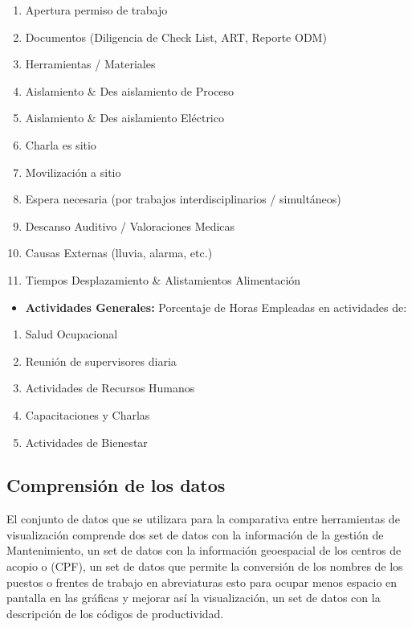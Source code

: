 \documentclass[
  11pt,
  bookmarksnumbered]{article}
\providecommand{\tightlist}{%
  \setlength{\itemsep}{0pt}\setlength{\parskip}{0pt}}
\begin{document}
\begin{enumerate}
\def\labelenumi{\arabic{enumi}.}
\tightlist
\item
  Apertura permiso de trabajo
\item
  Documentos (Diligencia de Check List, ART, Reporte ODM)~~~~~~~~~~
\item
  Herramientas / Materiales~~~~~~~~~~~~~~~~~~~~~~~~~~
\item
  Aislamiento \& Des aislamiento de Proceso~~~~~~~~~~~~~~~~~~~~~~~~~
\item
  Aislamiento \& Des aislamiento Eléctrico~~~~~~~~~~~~~~~~~~~~~~~~~~~~
\item
  Charla es sitio~~~~~~~~~~~~~~~~~~~~~~~
\item
  Movilización a sitio
\item
  Espera necesaria (por trabajos interdisciplinarios / simultáneos)~~
\item
  Descanso Auditivo / Valoraciones Medicas
\item
  Causas Externas (lluvia, alarma, etc.)
\item
  Tiempos Desplazamiento \& Alistamientos Alimentación
\end{enumerate}

\begin{itemize}
\tightlist
\item
  \textbf{Actividades Generales:} Porcentaje de Horas Empleadas en actividades de:
\end{itemize}

\begin{enumerate}
\def\labelenumi{\arabic{enumi}.}
\item
  Salud Ocupacional
\item
  Reunión de supervisores diaria
\item
  Actividades de Recursos Humanos
\item
  Capacitaciones y Charlas
\item
  Actividades de Bienestar
\end{enumerate}

\hypertarget{comprensiuxf3n-de-los-datos}{%
\subsection{Comprensión de los datos}\label{comprensiuxf3n-de-los-datos}}

El conjunto de datos que se utilizara para la comparativa entre herramientas de visualización comprende dos set de datos con la información de la gestión de Mantenimiento, un set de datos con la información geoespacial de los centros de acopio o (CPF), un set de datos que permite la conversión de los nombres de los puestos o frentes de trabajo en abreviaturas esto para ocupar menos espacio en pantalla en las gráficas y mejorar así la visualización, un set de datos con la descripción de los códigos de productividad.
\end{document}
